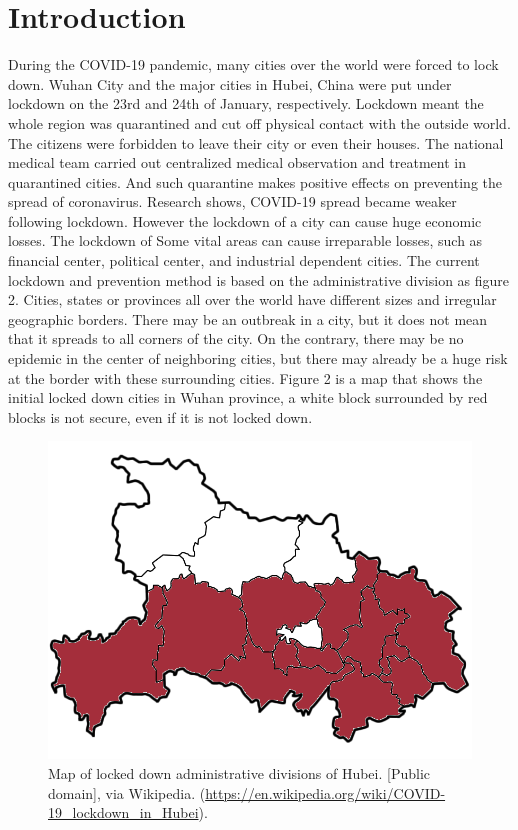 \documentclass[sigplan,screen]{acmart}
\begin{document}
\maketitle
\section{Introduction}
During the COVID-19 pandemic, many cities over the world were forced to lock down.
Wuhan City and the major cities in Hubei, China were put under lockdown on the 23rd and 24th of January, respectively\cite{lau2020positive}.
Lockdown meant the whole region was quarantined and cut off physical contact with the outside world.
The citizens were forbidden to leave their city or even their houses.
The national medical team carried out centralized medical observation and treatment in quarantined cities.
And such quarantine makes positive effects on preventing the spread of coronavirus.
Research shows, COVID-19 spread became weaker following lockdown\cite{lau2020positive}.
However the lockdown of a city can cause huge economic losses.
The lockdown of Some vital areas can cause irreparable losses, such as financial center, political center, and industrial dependent cities.
The current lockdown and prevention method is based on the administrative division as figure 2.
Cities, states or provinces all over the world have different sizes and irregular geographic borders.
There may be an outbreak in a city, but it does not mean that it spreads to all corners of the city. On the contrary, there may be no epidemic in the center of neighboring cities, but there may already be a huge risk at the border with these surrounding cities. Figure 2 is a map that shows the initial locked down cities in Wuhan province, a white block surrounded by red blocks is not secure, even if it is not locked down.
\begin{figure}[htb]
	\centering
	\includegraphics[width=\linewidth]{hubei.png}
	\caption{Map of locked down administrative divisions of Hubei. [Public domain], via Wikipedia. (\url{https://en.wikipedia.org/wiki/COVID-19_lockdown_in_Hubei}).}
\end{figure}
\end{document}
